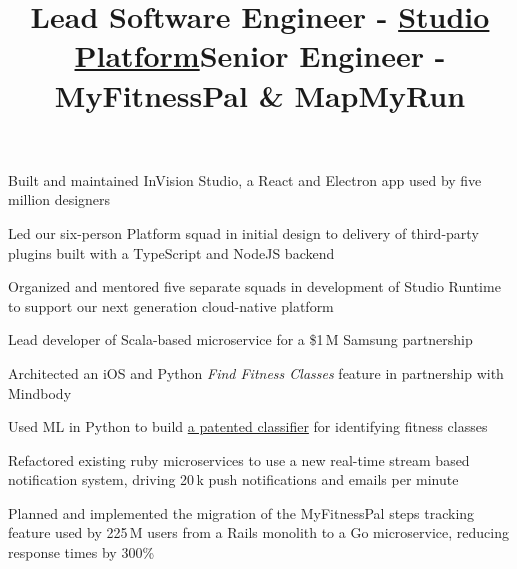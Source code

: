 \documentclass[12pt, tweaklist, line]{res}
\let\tempone\itemize
\let\temptwo\enditemize
\renewenvironment{itemize}{\tempone\vspace{-.15in}\setlength{\topsep}{0pt}\setlength{\itemsep}{3pt}\vspace{-.15in}}{\temptwo}
\begin{document}
\begin{resume}
\title{Lead Software Engineer - \href{https://www.invisionapp.com/studio}{Studio Platform}}
\begin{position}
\begin{itemize}
\item Built and maintained InVision Studio, a React and Electron app used by five million designers
\item Led our six-person Platform squad in initial design to delivery of third-party plugins built with a TypeScript and NodeJS backend
\item Organized and mentored five separate squads in development of Studio Runtime to support our next generation cloud-native platform
\end{itemize}
\end{position}

\title{Senior Engineer - MyFitnessPal \& MapMyRun}
\begin{position}
\begin{itemize}
\item Lead developer of Scala-based microservice for a \$1\,M Samsung partnership
\item Architected an iOS and Python \textit{Find Fitness Classes} feature in partnership with Mindbody
\item Used ML in Python to build \href{https://patents.google.com/patent/US20180225367A1/en?oq=20180225367}{a patented classifier} for identifying fitness classes
\item Refactored existing ruby microservices to use a new real-time stream based notification system, driving 20\,k push notifications and emails per minute
\item Planned and implemented the migration of the MyFitnessPal steps tracking feature used by 225\,M users from a Rails monolith to a Go microservice, reducing response times by 300\%
\end{itemize}
\end{position}


\pagebreak




\end{resume}
\end{document}
